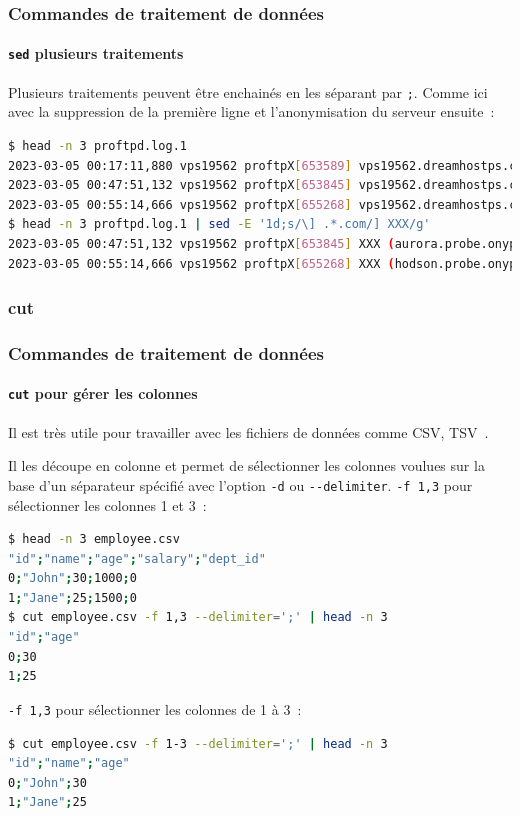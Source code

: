 \documentclass{beamer}
\begin{document}
    \begin{frame}[fragile]
        \transdissolve
        \frametitle{Commandes de traitement de données}
        \framesubtitle{\lstinline{sed} plusieurs traitements}
        Plusieurs traitements peuvent être enchainés en les séparant par \lstinline{;}.
        Comme ici avec la suppression de la première ligne et l'anonymisation du serveur ensuite~:
        \begin{lstlisting}[language=bash,basicstyle=\tiny\ttfamily]
$ head -n 3 proftpd.log.1
2023-03-05 00:17:11,880 vps19562 proftpX[653589] vps19562.dreamhostps.com: ProFTPD 1.3.6c (maint) (built Thu Feb 27 2020 19:34:56 UTC) standalone mode STARTUP
2023-03-05 00:47:51,132 vps19562 proftpX[653845] vps19562.dreamhostps.com (aurora.probe.onyphe.net[142.4.218.114]): USER anonymous: no such user found from aurora.probe.onyphe.net [142.4.218.114] to ::ffff:66.33.201.239:21
2023-03-05 00:55:14,666 vps19562 proftpX[655268] vps19562.dreamhostps.com (hodson.probe.onyphe.net[178.32.197.87]): USER anonymous: no such user found from hodson.probe.onyphe.net [178.32.197.87] to ::ffff:66.33.201.239:21
$ head -n 3 proftpd.log.1 | sed -E '1d;s/\] .*.com/] XXX/g'
2023-03-05 00:47:51,132 vps19562 proftpX[653845] XXX (aurora.probe.onyphe.net[142.4.218.114]): USER anonymous: no such user found from aurora.probe.onyphe.net [142.4.218.114] to ::ffff:66.33.201.239:21
2023-03-05 00:55:14,666 vps19562 proftpX[655268] XXX (hodson.probe.onyphe.net[178.32.197.87]): USER anonymous: no such user found from hodson.probe.onyphe.net [178.32.197.87] to ::ffff:66.33.201.239:21
        \end{lstlisting}
    \end{frame}

    \subsubsection{cut}\label{subsubsec:cut}
    \begin{frame}[fragile]
        \transdissolve
        \frametitle{Commandes de traitement de données}
        \framesubtitle{\lstinline{cut} pour gérer les colonnes}
        Il est très utile pour travailler avec les fichiers de données comme CSV, TSV~.

        Il les découpe en colonne et permet de sélectionner les colonnes voulues sur la base d'un séparateur spécifié avec l'option \lstinline{-d} ou \lstinline{--delimiter}.
        \bigbreak
        \lstinline{-f 1,3} pour sélectionner les colonnes 1 et 3~:
        \begin{lstlisting}[language=bash,basicstyle=\tiny\ttfamily]
$ head -n 3 employee.csv
"id";"name";"age";"salary";"dept_id"
0;"John";30;1000;0
1;"Jane";25;1500;0
$ cut employee.csv -f 1,3 --delimiter=';' | head -n 3
"id";"age"
0;30
1;25
        \end{lstlisting}
        \lstinline{-f 1,3} pour sélectionner les colonnes de 1 à 3~:
        \begin{lstlisting}[language=bash,basicstyle=\tiny\ttfamily]
$ cut employee.csv -f 1-3 --delimiter=';' | head -n 3
"id";"name";"age"
0;"John";30
1;"Jane";25
        \end{lstlisting}
    \end{frame}
\end{document}
